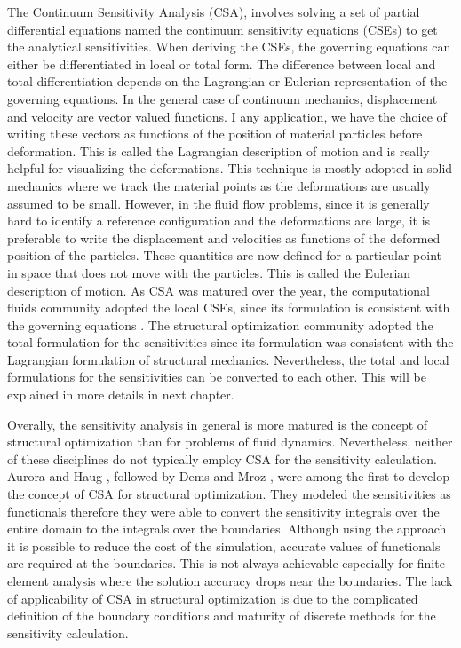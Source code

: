 The Continuum Sensitivity Analysis (CSA), involves solving a set of partial differential equations named the continuum sensitivity equations (CSEs) to get the analytical sensitivities. When deriving the CSEs, the governing equations can either be differentiated in local or total form. The difference between local and total differentiation depends on the Lagrangian or Eulerian representation of the governing equations. In the general case of continuum mechanics,  displacement and velocity are vector valued functions. I any application, we have the choice of writing these vectors as functions of the position of material particles before deformation. This is called the Lagrangian description of motion and is really helpful for visualizing the deformations. This technique is mostly adopted in solid mechanics where we track the material points as the deformations are usually assumed to be small. However, in the fluid flow problems, since it is generally hard to identify a reference configuration and the deformations are large, it is preferable to write the displacement and velocities as functions of the deformed position of the particles. These quantities are now defined for a particular point in space that does not move with the particles. This is called the Eulerian description of motion.  As CSA was matured over the year, the computational fluids community adopted the local CSEs, since its formulation is consistent with the governing equations \cite{borggaard1997pde, hristova2006continuous}. The structural optimization community adopted the total formulation for the sensitivities since its formulation was consistent with the Lagrangian formulation of structural mechanics. Nevertheless, the total and local formulations for the sensitivities can be converted to each other. This will be explained in more details in next chapter.

Overally, the sensitivity analysis in general is more matured is the concept of structural optimization than for problems of fluid dynamics. Nevertheless, neither of these disciplines do not typically employ CSA for the sensitivity calculation. Aurora and Haug \cite{Arora}, followed by Dems and Mroz \cite{Dems-Mroz}, were among the first to develop the concept of CSA for structural optimization. They modeled the sensitivities as functionals therefore they were able to convert the sensitivity integrals over the entire domain to the integrals over the boundaries. Although using the approach it is possible to reduce the cost of the simulation, accurate values of functionals are required at the boundaries. This is not always achievable especially for finite element analysis where the solution accuracy drops near the boundaries. The lack of applicability of CSA in structural optimization is due to the complicated definition of the boundary conditions and maturity of discrete methods for the sensitivity calculation. 

